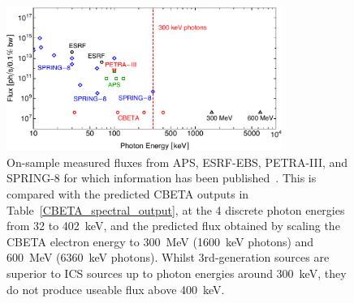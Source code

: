 \documentclass[../main.tex]{subfiles}
\begin{document}
\begin{figure}[!h]
\centering
\includegraphics[width=0.8\textwidth]{Figures/CBETA_Inverse_Compton_Source_Design/sourcefluxcomparison.pdf}
\caption{On-sample measured fluxes from APS, ESRF-EBS, PETRA-III, and SPRING-8 for which information has been published~\cite{apsbeamlines,esrfbeamlines,petraiiibeamlines,spring8beamlines}. This is compared with the predicted CBETA outputs in Table~\ref{CBETA_spectral_output}, at the 4 discrete photon energies from 32 to 402~keV, and the predicted flux obtained by scaling the CBETA electron energy to 300~MeV (1600~keV photons) and 600~MeV (6360~keV photons). Whilst 3rd-generation sources are superior to ICS sources up to photon energies around 300~keV, they do not produce useable flux above 400~keV.}
\label{fig:ICS_Undulator_Comparison}
\end{figure}
\end{document}
